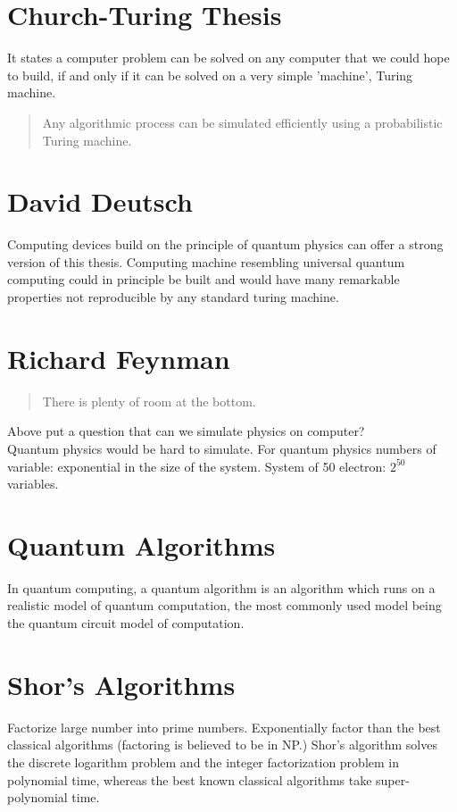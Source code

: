 \documentclass[11.5pt, paper=a4]{article}
\theoremstyle{definition}
\numberwithin{theorem}{section}
\begin{document}
\section{Church-Turing Thesis}
It states a computer problem can be solved on any computer that we could hope to build, if and only if it can be solved on a very simple 'machine', Turing machine.
\begin{quote}
    Any algorithmic process can be simulated efficiently using a
probabilistic Turing machine.
\end{quote}

\section{David Deutsch}
Computing devices build on the principle of quantum physics can offer a strong version of this thesis.
Computing machine resembling universal quantum computing could in principle be built and would have many remarkable properties not reproducible by any standard turing machine.

\section{Richard Feynman}
\begin{quote}
    There is plenty of room at the bottom.  \citet{feynman2018simulating}

\end{quote}

Above put a question that can we simulate physics on computer?\\
Quantum physics would be hard to simulate.
For quantum physics numbers of variable: exponential in the size of the system.
System of 50 electron: $2^{50}$ variables.

\section{Quantum Algorithms}
In quantum computing, a quantum algorithm is an algorithm which runs on a realistic model of quantum computation, the most commonly used model being the quantum circuit model of computation.


\section{Shor's Algorithms}
Factorize large number into prime numbers.
Exponentially factor than the best classical algorithms (factoring is believed to be in NP.) \citet{shor1994algorithms}
Shor's algorithm solves the discrete logarithm problem and the integer factorization problem in polynomial time, whereas the best known classical algorithms take super-polynomial time.
\end{document}
